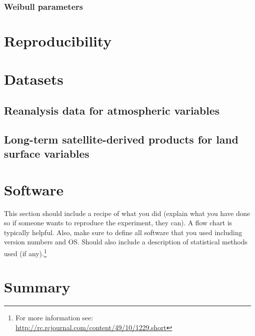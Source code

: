 \subsubsection{Weibull parameters}

\section{Reproducibility}

\section{Datasets}

\subsection{Reanalysis data for atmospheric variables}

\subsection{Long-term satellite-derived products for land surface variables}

\section{Software}

This section should include a recipe of what you did (explain what you have done so if someone wants to reproduce the experiment, they can).  A flow chart is typically helpful.  Also, make sure to define all software that you used including version numbers and OS.  Should also include a description of statistical methods used (if any).\footnote{For more information see: \url{http://rc.rcjournal.com/content/49/10/1229.short}}

\blindtext

\section*{Summary}
\blindtext